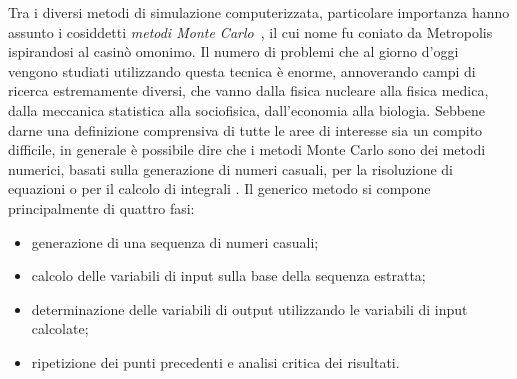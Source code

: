 Tra i diversi metodi di simulazione computerizzata, particolare importanza hanno assunto i cosiddetti \emph{metodi Monte Carlo}~\cite{metropolis:jasa49}, il cui nome fu coniato da Metropolis ispirandosi al casinò omonimo.
%
Il numero di problemi che al giorno d'oggi vengono studiati utilizzando questa tecnica è enorme, annoverando campi di ricerca estremamente diversi, che vanno dalla fisica nucleare alla fisica medica, dalla meccanica statistica alla sociofisica, dall'economia alla biologia.
%
%
%
Sebbene darne una definizione comprensiva di tutte le aree di interesse sia un compito difficile, in generale è possibile dire che i metodi Monte Carlo sono dei metodi numerici, basati sulla generazione di numeri casuali, per la risoluzione di equazioni o per il calcolo di integrali .
Il generico metodo si compone principalmente di quattro fasi:
\begin{itemize}
	\item generazione di una sequenza di numeri casuali;
	\item calcolo delle variabili di input sulla base della sequenza estratta;
	\item determinazione delle variabili di output utilizzando le variabili di input calcolate;
	\item ripetizione dei punti precedenti e analisi critica dei risultati.
\end{itemize}



